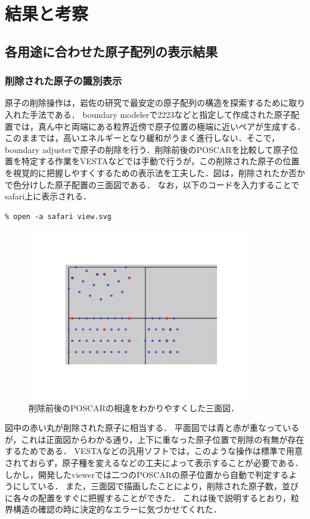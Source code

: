 
\section{結果と考察}
\subsection{各用途に合わせた原子配列の表示結果}
\subsubsection{削除された原子の識別表示}
原子の削除操作は，岩佐の研究で最安定の原子配列の構造を探索するために取り入れた手法である．
boundary modelerで2223などと指定して作成された原子配置では，真ん中と両端にある粒界近傍で原子位置の極端に近いペアが生成する．このままでは，高いエネルギーとなり緩和がうまく進行しない．そこで，boundary adjusterで原子の削除を行う．削除前後のPOSCARを比較して原子位置を特定する作業をVESTAなどでは手動で行うが，この削除された原子の位置を視覚的に把握しやすくするための表示法を工夫した．図は，削除されたか否かで色分けした原子配置の三面図である．
なお，以下のコードを入力することでsafari上に表示される．
\begin{lstlisting}[style=customCsh,basicstyle={\scriptsize\ttfamily}]
% ruby viewer.rb POSCAR_2223 POSCAR_2223_4
% open -a safari view.svg 
\end{lstlisting}
\begin{figure}[htbp]\begin{center}
\includegraphics[width=10cm,bb= 0 0 737 553]{../figs/./boundary_narita.010.jpeg}
\caption{削除前後のPOSCARの相違をわかりやすくした三面図．}
\label{default}\end{center}\end{figure}
図中の赤い丸が削除された原子に相当する．
平面図では青と赤が重なっているが，これは正面図からわかる通り，上下に重なった原子位置で削除の有無が存在するためである．
VESTAなどの汎用ソフトでは，このような操作は標準で用意されておらず，原子種を変えるなどの工夫によって表示することが必要である．
しかし，開発したviewerでは二つのPOSCARの原子位置から自動で判定するようにしている．
また，三面図で描画したことにより，削除された原子数，並びに各々の配置をすぐに把握することができた．
これは後で説明するとおり，粒界構造の確認の時に決定的なエラーに気づかせてくれた．

